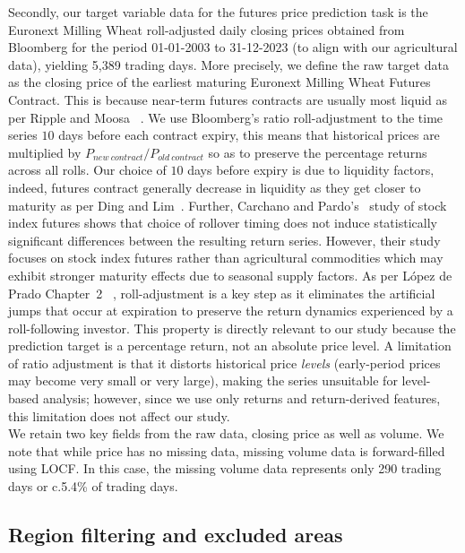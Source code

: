 \documentclass[pdflatex,sn-mathphys-num, oneside, 11pt]{sn-jnl}%
\theoremstyle{thmstyleone}%
\theoremstyle{thmstyletwo}%
\theoremstyle{thmstylethree}%
\begin{document}
Secondly, our target variable data for the futures price prediction task is the Euronext Milling Wheat roll-adjusted daily closing prices obtained from Bloomberg for the period 01-01-2003 to 31-12-2023 (to align with our agricultural data), yielding 5,389 trading days. More precisely, we define the raw target data as the closing price of the earliest maturing Euronext Milling Wheat Futures Contract. This is because near-term futures contracts are usually most liquid as per Ripple and Moosa ~\cite{bib84}. We use Bloomberg's ratio roll-adjustment to the time series $10$ days before each contract expiry, this means that historical prices are multiplied by $P_{new \ contract} / P_{old \ contract}$ so as to preserve the percentage returns across all rolls. Our choice of $10$ days before expiry is due to liquidity factors, indeed, futures contract generally decrease in liquidity as they get closer to maturity as per Ding and Lim~\cite{bib26}. Further, Carchano and Pardo's~\cite{bib25} study of stock index futures shows that choice of rollover timing does not induce statistically significant differences between the resulting return series. However, their study focuses on stock index futures rather than agricultural commodities which may exhibit stronger maturity effects due to seasonal supply factors. As per L{\'o}pez de Prado Chapter~2 ~\cite{bib24}, roll-adjustment is a key step as it eliminates the artificial jumps that occur at expiration to preserve the return dynamics experienced by a roll-following investor. This property is directly relevant to our study because the prediction target is a percentage return, not an absolute price level. A limitation of ratio adjustment is that it distorts historical price \emph{levels} (early-period prices may become very small or very large), making the series unsuitable for level-based analysis; however, since we use only returns and return-derived features, this limitation does not affect our study.\\

We retain two key fields from the raw data, closing price as well as volume. We note that while price has no missing data, missing volume data is forward-filled using LOCF. In this case, the missing volume data represents only 290 trading days or c.5.4\% of trading days.

\subsection{Region filtering and excluded areas}
\end{document}
